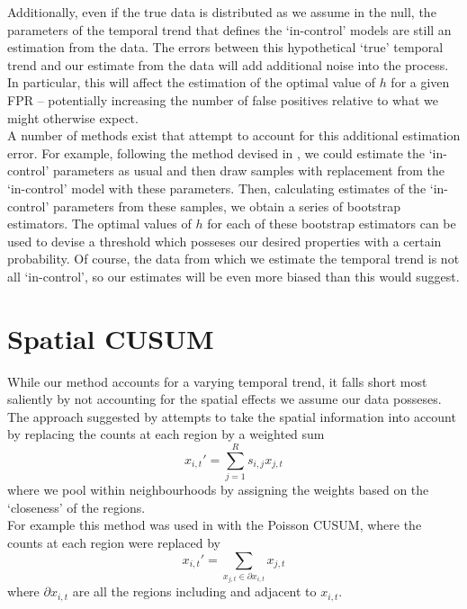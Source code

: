 \documentclass[11pt]{report}
\begin{document}
Additionally, even if the true data is distributed as we assume in the null, the parameters of the temporal trend that defines the `in-control' models are still an estimation from the data. The errors between this hypothetical `true' temporal trend and our estimate from the data will add additional noise into the process. In particular, this will affect the estimation of the optimal value of $h$ for a given FPR -- potentially increasing the number of false positives relative to what we might otherwise expect. \\

A number of methods exist that attempt to account for this additional estimation error. For example, following the method devised in \citet{gandy}, we could estimate the `in-control' parameters as usual and then draw samples with replacement from the `in-control' model with these parameters. Then, calculating estimates of the `in-control' parameters from these samples, we obtain a series of bootstrap estimators. The optimal values of $h$ for each of these bootstrap estimators can be used to devise a threshold which posseses our desired properties with a certain probability. Of course, the data from which we estimate the temporal trend is not all `in-control', so our estimates will be even more biased than this would suggest. 
 
\section{Spatial CUSUM}

While our method accounts for a varying temporal trend, it falls short most saliently by not accounting for the spatial effects we assume our data posseses. The approach suggested by \citet{raubertas} attempts to take the spatial information into account by replacing the counts at each region by a weighted sum
\begin{equation*}
x_{i,t}' = \sum_{j=1}^R s_{i, j} x_{j, t}
\end{equation*} 
where we pool within neighbourhoods by assigning the weights based on the `closeness' of the regions. \\

For example this method was used in \citet{spatialcusum} with the Poisson CUSUM, where the counts at each region were replaced by
\begin{equation*}
x_{i,t}' = \sum_{x_{j, t} \in \partial x_{i,t}} x_{j, t} 
\end{equation*} 
where $\partial x_{i,t}$ are all the regions including and adjacent to $x_{i,t}$. \\
\end{document}
